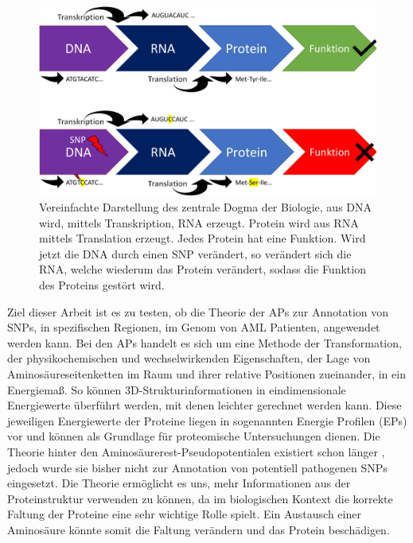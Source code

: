 \begin{figure}
    \centering
    \includegraphics[width=.99\textwidth]{images/Biologie_dogma.pdf}
    \caption{Vereinfachte Darstellung des zentrale Dogma der Biologie, aus DNA wird, mittels Transkription, RNA erzeugt. Protein wird aus RNA mittels Translation erzeugt. Jedes Protein hat eine Funktion. Wird jetzt die DNA durch einen \ac{SNP} verändert, so verändert sich die RNA, welche wiederum das Protein verändert, sodass die Funktion des Proteins gestört wird.}
    \label{fig:dogma}
\end{figure}

Ziel dieser Arbeit ist es zu testen, ob die Theorie der \ac{APs} zur Annotation von \ac{SNP}s, in spezifischen Regionen, im Genom von \ac{AML} Patienten, angewendet werden kann. Bei den \ac{APs} handelt es sich um eine Methode der Transformation, der physikochemischen und wechselwirkenden Eigenschaften, der Lage von Aminosäureseitenketten im Raum und ihrer relative Positionen zueinander, in ein Energiemaß. 
So können 3D-Strukturinformationen in eindimensionale Energiewerte überführt werden, mit denen leichter gerechnet werden kann. Diese jeweiligen Energiewerte der Proteine liegen in sogenannten Energie Profilen (\ac{EP}s) vor und können als Grundlage für proteomische Untersuchungen dienen. Die Theorie hinter den Aminosäurerest-Pseudopotentialen existiert schon länger \cite{Heinke.2011}, jedoch wurde sie bisher nicht zur Annotation von potentiell pathogenen \ac{SNP}s eingesetzt. Die Theorie ermöglicht es uns, mehr Informationen aus der Proteinstruktur verwenden zu können, da im biologischen Kontext die korrekte Faltung der Proteine eine sehr wichtige Rolle spielt. Ein Austausch einer Aminosäure könnte somit die Faltung verändern und das Protein beschädigen. 

